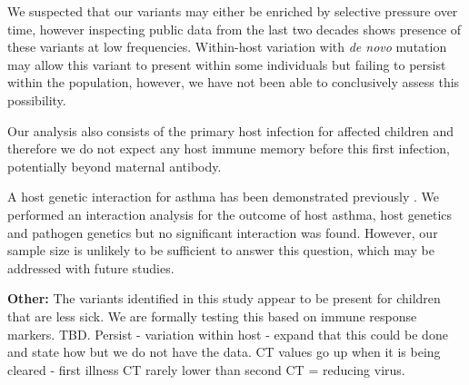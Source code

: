 \documentclass{article}
\begin{document}
We suspected that our variants may either be enriched by selective pressure over time, 
however inspecting public data from the last two decades shows presence of these variants at low frequencies.
Within-host variation with \textit{de novo} mutation may allow this variant to present within some individuals but failing to persist within the population, however, we have not been able to conclusively assess this possibility.

Our analysis also consists of the primary host infection for affected children and therefore we do not expect any host immune memory before this first infection, potentially beyond maternal antibody.

A host genetic interaction for asthma has been demonstrated previously 
\cite{moffatt2010large}.
We performed an interaction analysis for the outcome of host asthma, 
host genetics and pathogen genetics 
but no significant interaction was found. 
However, our sample size is unlikely to be sufficient to answer this question, 
which may be addressed with future studies. 

\textbf{Other:}
The variants identified in this study appear to be present for children that are less sick.
We are formally testing this based on immune response markers. TBD.
Persist - variation within host - expand that this could be done and state how but we do not have the data. 
CT values go up when it is being cleared  - first illness CT rarely lower than second CT = reducing virus.
\end{document}
